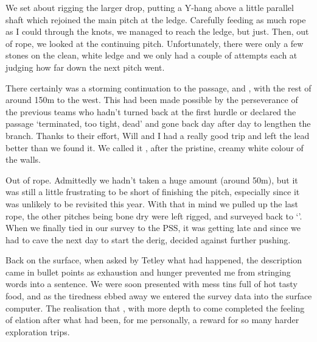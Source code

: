 We set about rigging the larger drop, putting a Y-hang above a little parallel shaft which rejoined the main pitch at the ledge. Carefully feeding as much rope as I could through the knots, we managed to reach the ledge, but just. Then, out of rope, we looked at the continuing pitch. Unfortunately, there were only a few stones on the clean, white ledge and we only had a couple of attempts each at judging how far down the next pitch went. 

There certainly was a storming continuation to the passage, and , with the rest of  around 150m to the west. This had been made possible by the perseverance of the previous teams who hadn't turned back at the first hurdle or declared the passage `terminated, too tight, dead' and gone back day after day to lengthen the branch.  Thanks to their effort, Will and I had  a really good trip and left the lead better than we found it. We called it , after the pristine, creamy white colour of the walls.

Out of rope. Admittedly we hadn't taken a huge amount (around 50m), but it was still a little frustrating to be short of finishing the pitch, especially since it was unlikely to be revisited this year.  With that in mind we pulled up the last rope, the other pitches being bone dry were left rigged, and surveyed back to `'. When we  finally tied in our survey to the PSS, it was getting late and since we had to cave the next day to start the derig, decided against further pushing. 

Back on the surface, when asked by Tetley what had happened, the description came in bullet points as exhaustion and hunger prevented me from stringing words into a sentence. We were soon presented with mess tins full of hot tasty food, and as the tiredness ebbed away we entered the survey data into the surface computer. The realisation that , with more depth to come completed the feeling of elation after what had been, for me personally, a reward for so many harder exploration trips.

